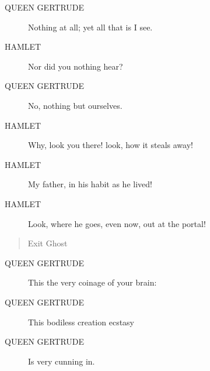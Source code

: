 \documentclass{article}
\begin{document}
\begin{description}
            
\item[QUEEN GERTRUDE] Nothing at all; yet all that is I see.
\end{description}
          
\begin{description}
            
\item[HAMLET] Nor did you nothing hear?
\end{description}
          
\begin{description}
            
\item[QUEEN GERTRUDE] No, nothing but ourselves.
\end{description}
          
\begin{description}
            
\item[HAMLET] Why, look you there! look, how it steals away!
\item[HAMLET] My father, in his habit as he lived!
\item[HAMLET] Look, where he goes, even now, out at the portal!
\end{description}
          
\begin{quote}
Exit Ghost
\end{quote}
          
\begin{description}
            
\item[QUEEN GERTRUDE] This the very coinage of your brain:
\item[QUEEN GERTRUDE] This bodiless creation ecstasy
\item[QUEEN GERTRUDE] Is very cunning in.
\end{description}
          
\end{document}
